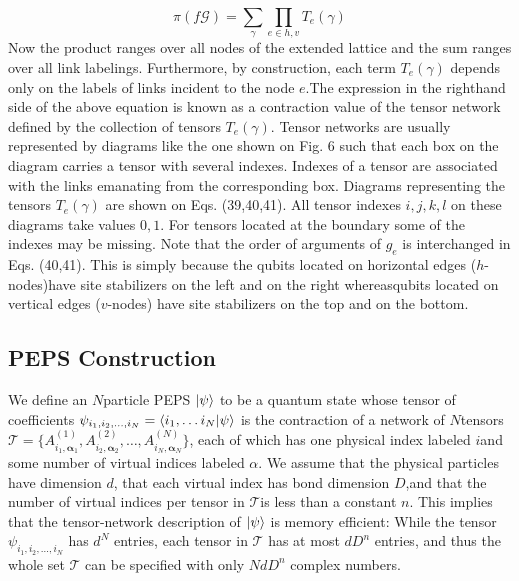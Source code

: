 \begin{equation*}
    \pi(f\mathcal{G}) = \sum_{\gamma} \prod_{e \in h,v} T_e(\gamma)
\end{equation*}
Now the product ranges over all nodes of the extended lattice and the sum ranges over all link labelings. Furthermore, by construction, each term \(T_e(\gamma)\) depends only on the labels of links incident to the node \(e\).The expression in the righthand side of the above equation is known as a contraction  value  of  the  tensor  network  defined  by  the collection of tensors \(T_e(\gamma)\). Tensor networks are usually represented by diagrams like the one shown on Fig. 6 such that each box on the diagram carries a tensor with several indexes.  Indexes of a tensor are associated with the links emanating from the corresponding box.  Diagrams representing the tensors \(T_e(\gamma)\) are shown on Eqs. (39,40,41). All tensor indexes \(i,j,k,l\) on these diagrams take values \(0,1\). For tensors located at the boundary some of the indexes may be missing.  Note that the order of arguments of \(g_e\) is interchanged in Eqs. (40,41).  This is simply because the qubits located on horizontal edges  (\(h\)-nodes)have site stabilizers on the left and on the right whereasqubits located on vertical edges (\(v\)-nodes) have site stabilizers on the top and on the bottom.


\subsection{PEPS Construction}
We define an \(N\)particle PEPS \(\ket{\psi}\) to be a quantum state whose tensor of coefficients \(\psi_{i_1, i_2,\dots,i_N} = \braket{i_1, \dots i_N}{\psi}\) is the contraction of a network  of \(N\)tensors \(\mathcal{T} = \{A_{i_1, \mathbf{\alpha}_1}^{(1)}, A_{i_2, \mathbf{\alpha}_2}^{(2)},\dots, A_{i_N, \mathbf{\alpha}_N}^{(N)} \}\), each of which has one physical index labeled \(i\)and some number of virtual indices labeled \(\alpha\). We assume that the physical particles have dimension \(d\), that each virtual index has bond dimension \(D\),and that the number of virtual indices per tensor in \(\mathcal{T}\)is less than a constant \(n\). This implies that the tensor-network description of \(\ket{\psi}\) is memory efficient: While the tensor \(\psi_{i_1, i_2,\dots,i_N}\) has \(d^N\) entries, each tensor in \(\mathcal{T}\) has at most \(dD^n\) entries, and thus the whole set \(\mathcal{T}\) can be specified with only \(NdD^n\) complex numbers.


